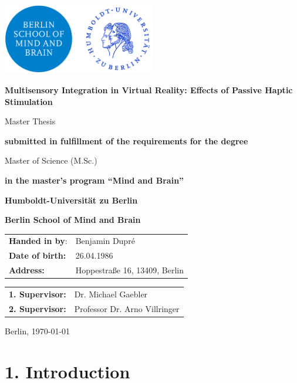 \documentclass[12pt,oneside,openright]{report}
\begin{document}
\begin{titlepage}
    \centering
    \includegraphics[width=0.5\textwidth]{Hu-logo.png}
    \vspace{2cm}
    
    {\huge \textbf{Multisensory Integration in Virtual Reality: Effects of Passive Haptic Stimulation}\par}
    \vspace{2cm}
    {\LARGE Master Thesis\par}
    \vspace{0.5cm}
    {\textbf{submitted in fulfillment of the requirements for the degree}\par}
    Master of Science (M.Sc.)\par
    {\textbf{in the master's program ``Mind and Brain''}\par}
    \vspace{1.5cm}
    {\textbf{Humboldt-Universität zu Berlin}\par}
    {\textbf{Berlin School of Mind and Brain}\par}
    \vfill
    \raggedright
    \begin{tabular}{ll}
        \textbf{Handed in by}: & Benjamin Dupré \\
        \textbf{Date of birth:} & 26.04.1986\\
       \textbf{ Address:} & Hoppestraße 16, 13409, Berlin \\
    \end{tabular}
    \vfill
    \begin{tabular}{ll}
        \textbf{1. Supervisor:}& Dr. Michael Gaebler \\
        \textbf{2. Supervisor:}& Professor Dr. Arno Villringer  \\
    \end{tabular}
    \vfill
    {Berlin, \today \par}
\end{titlepage}

\section*{1. Introduction}
\end{document}
